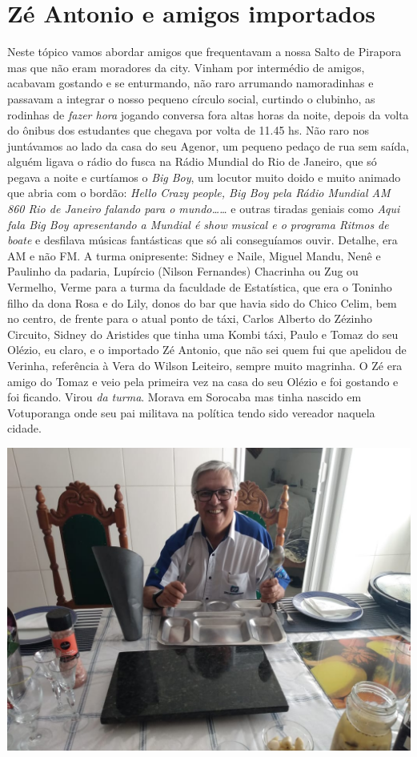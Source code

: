 \documentclass[12pt,brazil,]{book}
\begin{document}
\section{Zé Antonio e amigos
importados}\label{zuxe9-antonio-e-amigos-importados}

Neste tópico vamos abordar amigos que frequentavam a nossa Salto de
Pirapora mas que não eram moradores da city. Vinham por intermédio de
amigos, acabavam gostando e se enturmando, não raro arrumando
namoradinhas e passavam a integrar o nosso pequeno círculo social,
curtindo o clubinho, as rodinhas de \emph{fazer hora} jogando conversa
fora altas horas da noite, depois da volta do ônibus dos estudantes que
chegava por volta de 11.45 hs. Não raro nos juntávamos ao lado da casa
do seu Agenor, um pequeno pedaço de rua sem saída, alguém ligava o rádio
do fusca na Rádio Mundial do Rio de Janeiro, que só pegava a noite e
curtíamos o \emph{Big Boy}, um locutor muito doido e muito animado que
abria com o bordão: \emph{Hello Crazy people, Big Boy pela Rádio Mundial
AM 860 Rio de Janeiro falando para o mundo\ldots{}\ldots{}} e outras
tiradas geniais como \emph{Aqui fala Big Boy apresentando a Mundial é
show musical e o programa Ritmos de boate} e desfilava músicas
fantásticas que só ali conseguíamos ouvir. Detalhe, era AM e não FM. A
turma onipresente: Sidney e Naile, Miguel Mandu, Nenê e Paulinho da
padaria, Lupírcio (Nilson Fernandes) Chacrinha ou Zug ou Vermelho, Verme
para a turma da faculdade de Estatística, que era o Toninho filho da
dona Rosa e do Lily, donos do bar que havia sido do Chico Celim, bem no
centro, de frente para o atual ponto de táxi, Carlos Alberto do Zézinho
Circuito, Sidney do Aristides que tinha uma Kombi táxi, Paulo e Tomaz do
seu Olézio, eu claro, e o importado Zé Antonio, que não sei quem fui que
apelidou de Verinha, referência à Vera do Wilson Leiteiro, sempre muito
magrinha. O Zé era amigo do Tomaz e veio pela primeira vez na casa do
seu Olézio e foi gostando e foi ficando. Virou \emph{da turma}. Morava
em Sorocaba mas tinha nascido em Votuporanga onde seu pai militava na
política tendo sido vereador naquela cidade.

\includegraphics{Imagens/ZeAntonio.jpeg}
\end{document}
